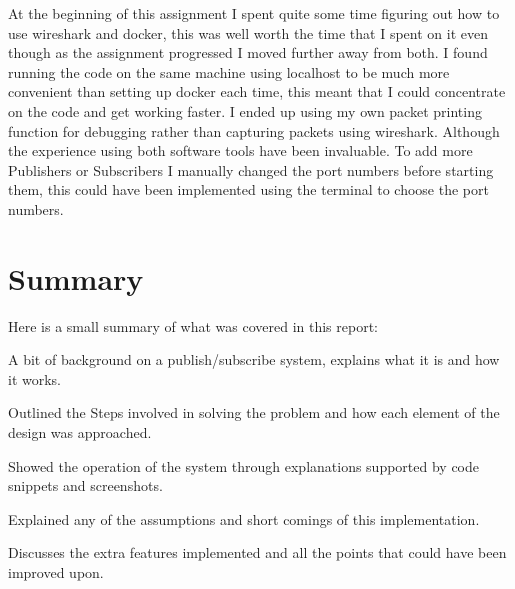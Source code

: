 \documentclass{article}
\begin{document}
\newline
\newline
At the beginning of this assignment I spent quite some time figuring out how to use wireshark and docker, this was well worth the time that I spent on it even though as the assignment progressed I moved further away from both. I found running the code on the same machine using localhost to be much more convenient than setting up docker each time, this meant that I could concentrate on the code and get working faster. I ended up using my own packet printing function for debugging rather than capturing packets using wireshark. Although the experience using both software tools have been invaluable.
\newline
\newline
To add more Publishers or Subscribers I manually changed the port numbers before starting them, this could have been implemented using the terminal to choose the port numbers.

\pagebreak

\section{Summary}
\label{sec:Summary}

Here is a small summary of what was covered in this report:
\begin{description}
	\item A bit of background on a publish/subscribe system, explains what it is and how it works.
	\item Outlined the Steps involved in solving the problem and how each element of the design was approached.
	\item Showed the operation of the system through explanations supported by code snippets and screenshots.
	\item Explained any of the assumptions and short comings of this implementation.
	\item Discusses the extra features implemented and all the points that could have been improved upon.
\end{description}


\end{document}
